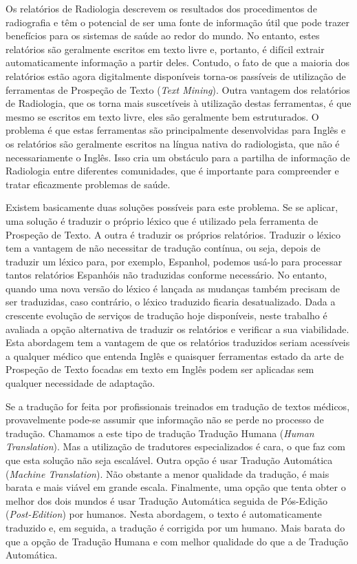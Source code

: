 \begin{abstractspt}
	
Os relatórios de Radiologia descrevem os resultados dos procedimentos de radiografia e têm o potencial de ser uma fonte de informação útil que pode trazer benefícios para os sistemas de saúde ao redor do mundo. No entanto, estes relatórios são geralmente escritos em texto livre e, portanto, é difícil extrair automaticamente informação a partir deles. Contudo, o fato de que a maioria dos relatórios estão agora digitalmente disponíveis torna-os passíveis de utilização de ferramentas de Prospeção de Texto (\textit{Text Mining}). Outra vantagem dos relatórios de Radiologia, que os torna mais suscetíveis à utilização destas ferramentas, é que mesmo se escritos em texto livre, eles são geralmente bem estruturados. O problema é que estas ferramentas são principalmente desenvolvidas para Inglês e os relatórios são geralmente escritos na língua nativa do radiologista, que não é necessariamente o Inglês. Isso cria um obstáculo para a partilha de informação de Radiologia entre diferentes comunidades, que é importante para compreender e tratar eficazmente problemas de saúde.

Existem basicamente duas soluções possíveis para este problema. Se se aplicar, uma solução é traduzir o próprio léxico que é utilizado pela ferramenta de Prospeção de Texto. A outra é traduzir os próprios relatórios. Traduzir o léxico tem a vantagem de não necessitar de tradução contínua, ou seja, depois de traduzir um léxico para, por exemplo, Espanhol, podemos usá-lo para processar tantos relatórios Espanhóis não traduzidas conforme necessário. No entanto, quando uma nova versão do léxico é lançada as mudanças também precisam de ser traduzidas, caso contrário, o léxico traduzido ficaria desatualizado. Dada a crescente evolução de serviços de tradução hoje disponíveis, neste trabalho é avaliada a opção alternativa de traduzir os relatórios e verificar a sua viabilidade. Esta abordagem tem a vantagem de que os relatórios traduzidos seriam acessíveis a qualquer médico que entenda Inglês e quaisquer ferramentas estado da arte de Prospeção de Texto focadas em texto em Inglês podem ser aplicadas sem qualquer necessidade de adaptação.

Se a tradução for feita por profissionais treinados em tradução de textos médicos, provavelmente pode-se assumir que informação não se perde no processo de tradução. Chamamos a este tipo de tradução Tradução Humana (\textit{Human Translation}). Mas a utilização de tradutores especializados é cara, o que faz com que esta solução não seja escalável. Outra opção é usar Tradução Automática (\textit{Machine Translation}). Não obstante a menor qualidade da tradução, é mais barata e mais viável em grande escala. Finalmente, uma opção que tenta obter o melhor dos dois mundos é usar Tradução Automática seguida de Pós-Edição (\textit{Post-Edition}) por humanos. Nesta abordagem, o texto é automaticamente traduzido e, em seguida, a tradução é corrigida por um humano. Mais barata do que a opção de Tradução Humana e com melhor qualidade do que a de Tradução Automática.


\end{abstractspt}
